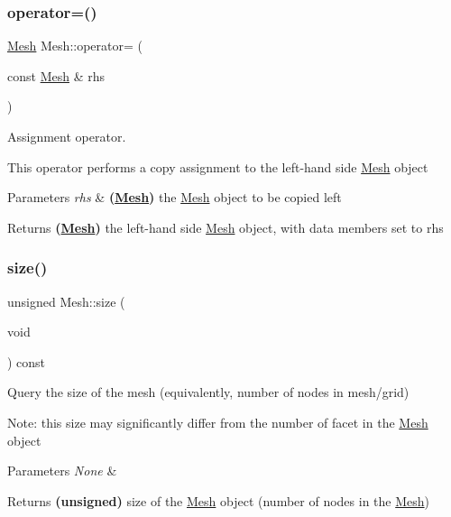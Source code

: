 \subsubsection{\texorpdfstring{operator=()}{operator=()}}
{\footnotesize\ttfamily \mbox{\hyperlink{class_mesh}{Mesh}} Mesh\+::operator= (\begin{DoxyParamCaption}\item[{const \mbox{\hyperlink{class_mesh}{Mesh}} \&}]{rhs }\end{DoxyParamCaption})}



Assignment operator. 

This operator performs a copy assignment to the left-\/hand side \mbox{\hyperlink{class_mesh}{Mesh}} object 
\begin{DoxyParams}{Parameters}
{\em rhs} & {\bfseries (\mbox{\hyperlink{class_mesh}{Mesh}})} the \mbox{\hyperlink{class_mesh}{Mesh}} object to be copied left \\
\hline
\end{DoxyParams}
\begin{DoxyReturn}{Returns}
{\bfseries (\mbox{\hyperlink{class_mesh}{Mesh}})} the left-\/hand side \mbox{\hyperlink{class_mesh}{Mesh}} object, with data members set to rhs\textquotesingle{} 
\end{DoxyReturn}
\mbox{\label{class_mesh_a716f8cde80ac5f0ed592aaa56995f618}} 
\subsubsection{\texorpdfstring{size()}{size()}}
{\footnotesize\ttfamily unsigned Mesh\+::size (\begin{DoxyParamCaption}\item[{void}]{ }\end{DoxyParamCaption}) const\hspace{0.3cm}{\ttfamily [inline]}}



Query the size of the mesh (equivalently, number of nodes in mesh/grid) 

Note\+: this size may significantly differ from the number of facet in the \mbox{\hyperlink{class_mesh}{Mesh}} object 
\begin{DoxyParams}{Parameters}
{\em None} & \\
\hline
\end{DoxyParams}
\begin{DoxyReturn}{Returns}
{\bfseries (unsigned)} size of the \mbox{\hyperlink{class_mesh}{Mesh}} object (number of nodes in the \mbox{\hyperlink{class_mesh}{Mesh}}) 
\end{DoxyReturn}
\mbox{\label{class_mesh_a4d194fe4ce2b4fa4c11274c893c6ae29}} 
